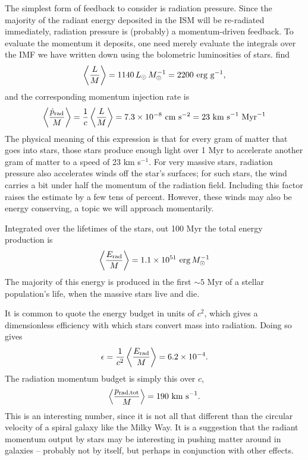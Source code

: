 The simplest form of feedback to consider is radiation pressure. Since the majority of the radiant energy deposited in the ISM will be re-radiated immediately, radiation pressure is (probably) a momentum-driven feedback. To evaluate the momentum it deposits, one need merely evaluate the integrals over the IMF we have written down using the bolometric luminosities of stars. \citet{murray10b} find
\begin{equation}
\left\langle \frac{L}{M}\right \rangle = 1140 \,L_{\odot}\,M_{\odot}^{-1} = 2200\mbox{ erg g}^{-1},
\end{equation}
and the corresponding momentum injection rate is
\begin{equation}
\left\langle \frac{\dot{p}_{\rm rad}}{M}\right \rangle = \frac{1}{c} \left\langle \frac{L}{M}\right \rangle = 7.3\times 10^{-8}\mbox{ cm s}^{-2} = 23\mbox{ km s}^{-1}\mbox{ Myr}^{-1}
\end{equation}
The physical meaning of this expression is that for every gram of matter that goes into stars, those stars produce enough light over 1 Myr to accelerate another gram of matter to a speed of 23 km s$^{-1}$. For very massive stars, radiation pressure also accelerates winds off the star's surfaces; for such stars, the wind carries a bit under half the momentum of the radiation field. Including this factor raises the estimate by a few tens of percent.  However, these winds may also be energy conserving, a topic we will approach momentarily.

Integrated over the lifetimes of the stars, out 100 Myr the total energy production is
\begin{equation}
\left\langle \frac{E_{\rm rad}}{M}\right\rangle = 1.1\times 10^{51}\mbox{ erg}\,M_{\odot}^{-1}
\end{equation}
The majority of this energy is produced in the first $\sim 5$ Myr of a stellar population's life, when the massive stars live and die.

It is common to quote the energy budget in units of $c^2$, which gives a dimensionless efficiency with which stars convert mass into radiation. Doing so gives
\begin{equation}
\epsilon = \frac{1}{c^2} \left\langle \frac{E_{\rm rad}}{M}\right\rangle = 6.2\times 10^{-4}.
\end{equation}
The radiation momentum budget is simply this over $c$,
\begin{equation}
\left\langle \frac{p_{\rm rad,tot}}{M}\right\rangle = 190\mbox{ km s}^{-1}.
\end{equation}
This is an interesting number, since it is not all that different than the circular velocity of a spiral galaxy like the Milky Way. It is a suggestion that the radiant momentum output by stars may be interesting in pushing matter around in galaxies -- probably not by itself, but perhaps in conjunction with other effects.

